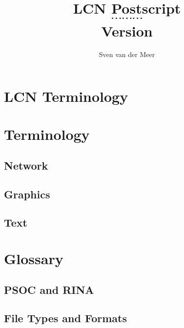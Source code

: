 \documentclass[a4paper,final,notitlepage,makeindex]{article}
\begin{document}
    \renewcommand*{\bibfont}{\citefont}
    \newcommand{\lcncite}[1]{{\citefont\cite{#1}}}

    \author{Sven van der Meer}
    \title{LCN Postscript \\ $\cdots \cdots \cdots$ \\ \small{Version }}
    \maketitle

    

    \begin{multicols}{2}
        \setcounter{tocdepth}{3}
        \tableofcontents
    \end{multicols}
    \newpage

    \section{LCN Terminology}
        

    \section{Terminology}
        \subsection{Network}
            
        \subsection{Graphics}
            
        \subsection{Text}
            

    \section{Glossary}
        \subsection{PSOC and RINA}
            

        \subsection{File Types and Formats}
            
\end{document}
